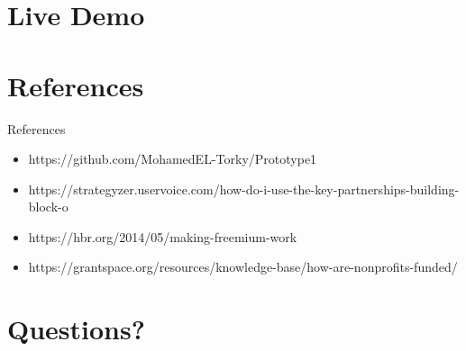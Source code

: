 \documentclass{beamer}
\begin{document}
\section{Live Demo}



\section{References}
\begin{frame}[shrink]{References}
\begin{itemize}

    \item https://github.com/MohamedEL-Torky/Prototype1 
    
    \item https://strategyzer.uservoice.com/how-do-i-use-the-key-partnerships-building-block-o
    \item https://hbr.org/2014/05/making-freemium-work
    \item https://grantspace.org/resources/knowledge-base/how-are-nonprofits-funded/
\end{itemize}
\end{frame}


\section*{Questions?}
\end{document}
